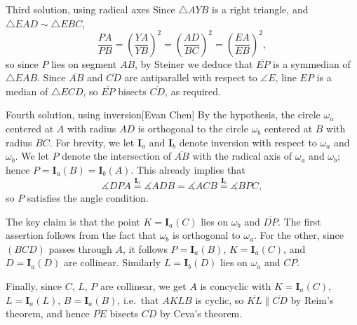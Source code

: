 \begin{customenv}{Third solution, using radical axes}
    Since $\triangle AYB$ is a right triangle, and $\triangle EAD\sim\triangle EBC$, \[\frac{PA}{PB}=\left(\frac{YA}{YB}\right)^2=\left(\frac{AD}{BC}\right)^2=\left(\frac{EA}{EB}\right)^2,\]
    so since $P$ lies on segment $AB$, by Steiner we deduce that $\overline{EP}$ is a symmedian of $\triangle EAB$. Since $\overline{AB}$ and $\overline{CD}$ are antiparallel with respect to $\angle E$, line $EP$ is a median of $\triangle ECD$, so $\overline{EP}$ bisects $\overline{CD}$, as required. 
\end{customenv}
\begin{customenv}{Fourth solution, using inversion}[Evan Chen]
    By the hypothesis, the circle $\omega_a$ centered at $A$ with radius $AD$ is orthogonal to the circle $\omega_b$ centered at $B$ with radius $BC$. For brevity, we let $\mathbf{I}_a$ and $\mathbf{I}_b$ denote inversion with respect to $\omega_a$ and $\omega_b$. We let $P$ denote the intersection of $\overline{AB}$ with the radical axis of $\omega_a$ and $\omega_b$; hence $P = \mathbf I_a(B) = \mathbf I_b(A)$. This already implies that \[\measuredangle DPA \overset{\mathbf{I}_a}=\measuredangle ADB=\measuredangle ACB \overset{\mathbf{I}_b}=\measuredangle BPC,\]
    so $P$ satisfies the angle condition.

    The key claim is that the point $K=\mathbf I_a(C)$ lies on $\omega_b$ and $\overline{DP}$. The first assertion follows from the fact that $\omega_b$ is orthogonal to $\omega_a$. For the other, since $(BCD)$ passes through $A$, it follows $P=\mathbf I_a(B)$, $K=\mathbf I_a(C)$, and $D=\mathbf I_a(D)$ are collinear. Similarly $L=\mathbf I_b(D)$ lies on  $\omega_a$ and $\overline{CP}$.

    Finally, since $C$, $L$, $P$ are collinear, we get $A$ is concyclic with $K=\mathbf I_a(C)$, $L=\mathbf I_a(L)$, $B=\mathbf I_a(B)$, i.e.\ that $AKLB$ is cyclic, so $\overline{KL}\parallel\overline{CD}$ by Reim's theorem, and hence $\overline{PE}$ bisects $\overline{CD}$ by Ceva's theorem.
\end{customenv}
